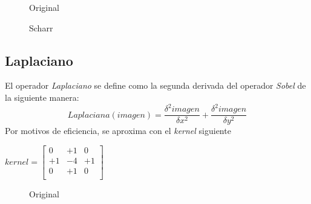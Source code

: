 \begin{figure}[H]
  \caption{Original}
  \centering \setlength\fboxsep{0pt} \setlength\fboxrule{0.5pt}
\end{figure}

\begin{figure}[H]
  \centering \setlength\fboxsep{0pt} \setlength\fboxrule{0.5pt}
  \caption{Scharr}
\end{figure}

\subsection{Laplaciano}
El operador \emph{Laplaciano} se define como la segunda derivada del
operador \emph{Sobel} de la siguiente manera:
\begin{equation*}
  Laplaciana(imagen) = \frac{\delta^{2} imagen}{\delta x^{2}} + \frac{\delta^{2} imagen}{\delta y^{2}}
\end{equation*}
Por motivos de eficiencia, se aproxima con el \emph{kernel} siguiente
\begin{center}
  $ kernel = \begin{bmatrix}
    0 & +1 & 0 \\
    +1 & -4 & +1 \\
    0 & +1 & 0 \\
  \end{bmatrix}
  $
\end{center}

\begin{figure}[H]
  \caption{Original}
  \centering \setlength\fboxsep{0pt} \setlength\fboxrule{0.5pt}
\end{figure}

